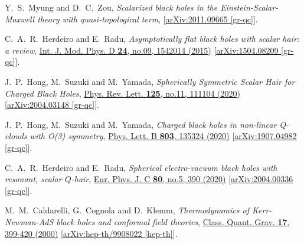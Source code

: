 \documentclass[pr, twocolumn, preprintnumbers, showpacs,footnoteadded, superscriptaddress,nofootinbib,longbibliography]{revtex4-1}
\begin{document}
\begin{thebibliography}{99}
Y.~S.~Myung and D.~C.~Zou,
\emph{Scalarized black holes in the Einstein-Scalar-Maxwell theory with quasi-topological term},
[\href{https://arxiv.org/pdf/2011.09665.pdf}{arXiv:2011.09665 [gr-qc]}].

C.~A.~R.~Herdeiro and E.~Radu,
\emph{Asymptotically flat black holes with scalar hair: a review},
\href{https://www.worldscientific.com/doi/abs/10.1142/S0218271815420146}{Int. J. Mod. Phys. D \textbf{24}, no.09, 1542014 (2015)}
[\href{https://arxiv.org/pdf/1504.08209.pdf}{arXiv:1504.08209 [gr-qc]}].



J.~P.~Hong, M.~Suzuki and M.~Yamada,
\emph{Spherically Symmetric Scalar Hair for Charged Black Holes},
\href{https://journals.aps.org/prl/abstract/10.1103/PhysRevLett.125.111104}{Phys. Rev. Lett. \textbf{125}, no.11, 111104 (2020)}
[\href{https://arxiv.org/pdf/2004.03148.pdf}{arXiv:2004.03148 [gr-qc]}].

J.~P.~Hong, M.~Suzuki and M.~Yamada,
\emph{Charged black holes in non-linear Q-clouds with O(3) symmetry},
\href{https://www.sciencedirect.com/science/article/pii/S0370269320301283?via3Dihub}{Phys. Lett. B \textbf{803}, 135324 (2020)}
[\href{https://arxiv.org/pdf/1907.04982.pdf}{arXiv:1907.04982 [gr-qc]}].

C.~A.~R.~Herdeiro and E.~Radu,
\emph{Spherical electro-vacuum black holes with resonant, scalar $Q$-hair},
\href{https://link.springer.com/article/10.1140/epjc/s10052-020-7976-9}{Eur. Phys. J. C \textbf{80}, no.5, 390 (2020)}
[\href{https://arxiv.org/pdf/2004.00336.pdf}{arXiv:2004.00336 [gr-qc]}].

M.~M.~Caldarelli, G.~Cognola and D.~Klemm,
\emph{Thermodynamics of Kerr-Newman-AdS black holes and conformal field theories},
\href{https://iopscience.iop.org/article/10.1088/0264-9381/17/2/310}{Class. Quant. Grav. \textbf{17}, 399-420 (2000)}
[\href{https://arxiv.org/pdf/hep-th/9908022.pdf}{arXiv:hep-th/9908022 [hep-th]}].


\end{thebibliography}
\end{document}
